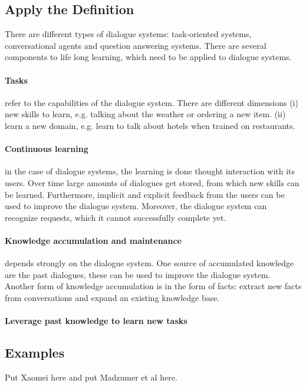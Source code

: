 \documentclass{lihlith}
\theoremstyle{definition}
\theoremstyle{remark}
\begin{document}
\subsection{Apply the Definition}
There are different types of dialogue systems: task-oriented systems, conversational agents and question answering systems. 
There are several components to life long learning, which need to be applied to dialogue systems. 
\paragraph{Tasks} refer to the capabilities of the dialogue system. There are different dimensions (i) new skills to learn, e.g. talking about the weather or ordering a new item. (ii) learn a new domain, e.g. learn to talk about hotels when trained on restaurants. 
\paragraph{Continuous learning} in the case of dialogue systems, the learning is done thought interaction with its users. Over time large amounts of dialogues get stored, from which new skills can be learned. Furthermore, implicit and explicit feedback from the users can be used to improve the dialogue system. Moreover, the dialogue system can recognize requests, which it cannot successfully complete yet. 
\paragraph{Knowledge accumulation and maintenance} depends strongly on the dialogue system. One source of accumulated knowledge are the past dialogues, these can be used to improve the dialogue system. Another form of knowledge accumulation is in the form of facts: extract new facts from conversations and expand an existing knowledge base. 
\paragraph{Leverage past knowledge to learn new tasks}  
\subsection{Examples}

Put Xaomei here and put Madzumer et al here.


\clearpage
{}

\end{document}
